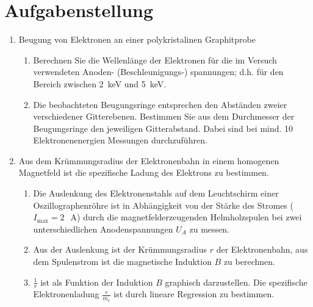 \documentclass{article}
\begin{document}
\parindent0cm

\renewcommand{\max}{\operatorname{max}}


\tableofcontents
\newpage

\pagestyle{fancy}

\section{Aufgabenstellung}

\begin{enumerate}
\item Beugung von Elektronen an einer polykristalinen Graphitprobe
\begin{enumerate}
\item Berechnen Sie die Wellenlänge der Elektronen für die im Versuch
verwendeten Anoden- (Beschleunigungs-) spannungen; d.h. für den Bereich
zwischen 2~keV und 5~keV.
\item Die beobachteten Beugungsringe entsprechen den Abständen zweier
verschiedener Gitterebenen. Bestimmen Sie aus dem Durchmesser der
Beugungsringe den jeweiligen Gitterabstand. Dabei sind bei mind. 10
Elektronenenergien Messungen durchzuführen. 
\end{enumerate}
\item Aus dem Krümmungsradius der Elektronenbahn in einem homogenen
Magnetfeld ist die spezifische Ladung 	des Elektrons zu
bestimmen.
\begin{enumerate}
\item  Die Auslenkung des Elektronenstahls auf dem Leuchtschirm einer
Oszillographenröhre ist in Abhängigkeit von der Stärke des Stromes ($I_{\max}=2~$~A) durch die magnetfelderzeugenden Helmholzspulen bei zwei unterschiedlichen Anodenspannungen $U_A$ zu messen.	
\item Aus der Auslenkung ist der Krümmungsradius $r$ der Elektronenbahn, aus dem Spulenstrom ist die magnetische Induktion $B$ zu berechnen.
\item $\frac{1}{r}$ ist als Funktion der Induktion $B$ graphisch darzustellen. Die spezifische
Elektronenladung $\frac{e}{m_e}$ ist durch lineare Regression zu bestimmen. 
\end{enumerate}
\end{enumerate}


\end{document}

